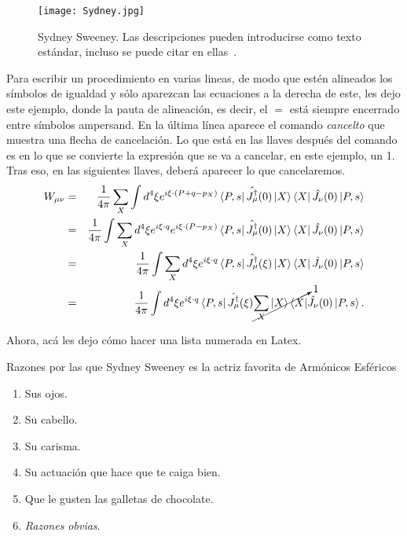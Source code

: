 \documentclass[letter,twoside,12pt]{book}
\begin{document}
\begin{figure}[H]
\begin{center}
\texttt{[image: Sydney.jpg]}\\
  \caption{\footnotesize Sydney Sweeney. Las descripciones pueden introducirse como texto estándar, incluso se puede citar en ellas~\cite{Barone}.}
\label{Sydney}
\end{center}
\end{figure}

Para escribir un procedimiento en varias lineas, de modo que estén alineados los símbolos de igualdad y sólo aparezcan las ecuaciones a la derecha de este, les dejo este ejemplo, donde la pauta de alineación, es decir, el $=$ está siempre encerrado entre símbolos ampersand. En la última línea aparece el comando \textit{cancelto} que muestra una flecha de cancelación. Lo que está en las llaves después del comando es en lo que se convierte la expresión que se va a cancelar, en este ejemplo, un 1. Tras eso, en las siguientes llaves, deberá aparecer lo que cancelaremos.
\begin{eqnarray}
    W_{\mu \nu}&=&\frac{1}{4\pi}\sum_X \int d^4 \xi  e^{i\xi \cdot (P+q-p_X)} \bra{P,s}\hat{J_{\mu}^{\dagger}}(0)\ket{X}
    \bra{X}\hat{J_{\nu}}(0)\ket{P,s} \nonumber\\
%
    &=&\frac{1}{4\pi} \int  \sum_X d^4 \xi e^{i\xi \cdot q}
    e^{i\xi \cdot (P-p_X)}\bra{P,s}\hat{J_{\mu}^{\dagger}}(0)\ket{X}
    \bra{X}\hat{J_{\nu}}(0)\ket{P,s} \nonumber\\
%
    &=&\frac{1}{4\pi} \int \sum_X d^4 \xi e^{i\xi \cdot q}
    \bra{P,s}\hat{J_{\mu}^{\dagger}}(\xi)\ket{X}
    \bra{X}\hat{J_{\nu}}(0)\ket{P,s} \nonumber\\
%
    &=&\frac{1}{4\pi} \int d^4 \xi e^{i\xi \cdot q} \bra{P,s}\hat{J_{\mu}^{\dagger}}(\xi) \cancelto{1}{\sum_X \ket{X}\bra{X}}\hat{J_{\nu}}(0)\ket{P,s} .
    \label{ec:label}
\end{eqnarray}



Ahora, acá les dejo cómo hacer una lista numerada en Latex. 

Razones por las que Sydney Sweeney es la actriz favorita de Armónicos Esféricos
\begin{enumerate}
   \item Sus ojos.
    \item Su cabello.
    \item Su carisma.
    \item Su actuación que hace que te caiga bien.
    \item Que le gusten las galletas de chocolate.
    \item \textit{Razones obvias}.
\end{enumerate}
\end{document}
